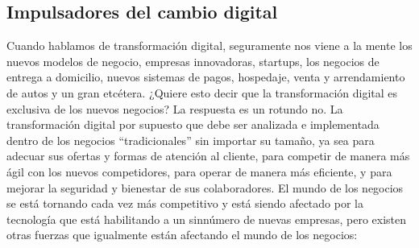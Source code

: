 \documentclass[12pt]{article}
\begin{document}
\subsection*{Impulsadores del cambio digital}
Cuando hablamos de transformación digital, seguramente nos viene a la mente los nuevos modelos de negocio, empresas innovadoras, startups, los negocios de entrega a domicilio, nuevos sistemas de pagos, hospedaje, venta y arrendamiento de autos y un gran etcétera. ¿Quiere esto decir que la transformación digital es exclusiva de los nuevos negocios? La respuesta es un rotundo no. La transformación digital por supuesto que debe ser analizada e implementada dentro de los negocios “tradicionales” sin importar su tamaño, ya sea para adecuar sus ofertas y formas de atención al cliente, para competir de manera más ágil con los nuevos competidores, para operar de manera más eficiente, y para mejorar la seguridad y bienestar de sus colaboradores.
El mundo de los negocios se está tornando cada vez más competitivo y está siendo afectado por la tecnología que está habilitando a un sinnúmero de nuevas empresas, pero existen otras fuerzas que igualmente están afectando el mundo de los negocios:
\end{document}
